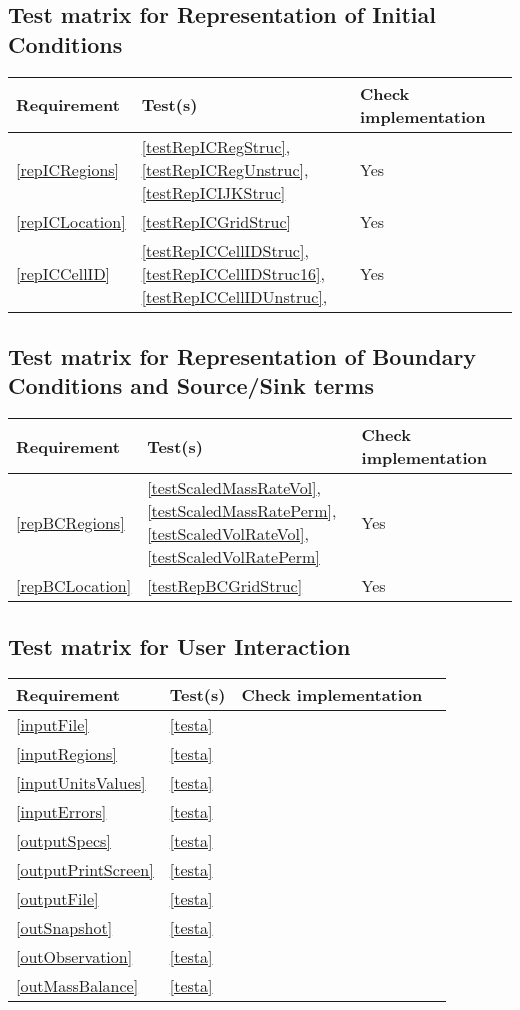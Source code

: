 \subsection{Test matrix for Representation of Initial Conditions}
\begin{tabular}{|l|l|l|l|}
	\hline
	Requirement & Test(s) & Check implementation \\
	\hline
	\hline
	\ref{repICRegions} & \ref{testRepICRegStruc}, \ref{testRepICRegUnstruc}, \ref{testRepICIJKStruc}  & Yes \\
	\hline
	\ref{repICLocation} &  \ref{testRepICGridStruc} & Yes \\
	\hline
	\ref{repICCellID} & \ref{testRepICCellIDStruc}, \ref{testRepICCellIDStruc16}, \ref{testRepICCellIDUnstruc}, & Yes\\
	\hline
\end{tabular}

\subsection{Test matrix for Representation of Boundary Conditions and Source/Sink terms}
\begin{tabular}{|l|l|l|l|}
	\hline
	Requirement & Test(s) & Check implementation \\
	\hline
	\hline
	\ref{repBCRegions}& \ref{testScaledMassRateVol}, \ref{testScaledMassRatePerm}, 
	\ref {testScaledVolRateVol}, \ref{testScaledVolRatePerm} & Yes \\
	\hline
	\ref{repBCLocation} & \ref{testRepBCGridStruc} & Yes \\
	\hline
\end{tabular}

\subsection{Test matrix for User Interaction}
\begin{tabular}{|l|l|l|l|}
	\hline
	Requirement & Test(s) & Check implementation \\
	\hline
	\hline
		\ref{inputFile} & \ref{testa} \\
	\hline
		\ref{inputRegions} & \ref{testa} \\
	\hline
		\ref{inputUnitsValues} & \ref{testa} \\
	\hline
		\ref{inputErrors} & \ref{testa} \\
	\hline
		\ref{outputSpecs} & \ref{testa} \\
	\hline
		\ref{outputPrintScreen} & \ref{testa} \\
	\hline
		\ref{outputFile} & \ref{testa} \\
	\hline
		\ref{outSnapshot} & \ref{testa} \\
	\hline
		\ref{outObservation} & \ref{testa} \\
	\hline
		\ref{outMassBalance} & \ref{testa} \\
	\hline
\end{tabular}

